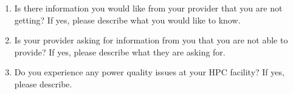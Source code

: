 \begin{enumerate}
\item
Is there information you would like from your provider that you are not getting? If yes, 
please describe what you would like to know.

\item
Is your provider asking for information from you that you are not able to provide? If yes, 
please describe what they are asking for.

\item
Do you experience any power quality issues at your HPC facility? If yes, please describe.

\end{enumerate}
